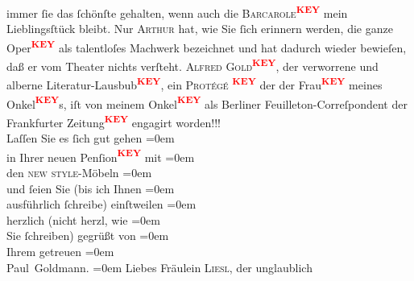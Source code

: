 \begin{ledgroupsized}[t]{13cm}
               immer ſie das ſchönſte gehalten, wenn auch die \textsc{Barcarole\textcolor{red}{\textsuperscript{\textbf{KEY}}}} mein Lieblingsſtück bleibt. Nur \textsc{Arthur} hat, wie Sie ſich erinnern werden, die ganze Oper\textcolor{red}{\textsuperscript{\textbf{KEY}}}
               als talentloſes Machwerk bezeichnet und hat dadurch wieder bewieſen, daß er vom
               Theater nichts verſteht.\pend
           \pstart
           \textsc{Alfred Gold\textcolor{red}{\textsuperscript{\textbf{KEY}}}}, der verworrene {\pb} und
               alberne Literatur-Lausbub\textcolor{red}{\textsuperscript{\textbf{KEY}}}, ein \textsc{Protégé \textcolor{red}{\textsuperscript{\textbf{KEY}}}} der der Frau\textcolor{red}{\textsuperscript{\textbf{KEY}}} meines Onkel\textcolor{red}{\textsuperscript{\textbf{KEY}}}s, iſt von meinem Onkel\textcolor{red}{\textsuperscript{\textbf{KEY}}} als Berliner
               Feuilleton-Correſpondent der Frankfurter Zeitung\textcolor{red}{\textsuperscript{\textbf{KEY}}} engagirt
               worden!!! {\\[\baselineskip]}Laſſen Sie es ſich gut gehen\pend
           \leftskip=0em{}\pstart
           {\\[\baselineskip]}in Ihrer neuen Penſion\textcolor{red}{\textsuperscript{\textbf{KEY}}} mit\pend
           \leftskip=0em{}\pstart
           {\\[\baselineskip]}den \textsc{new style}-Möbeln\pend
           \leftskip=0em{}\pstart
           {\\[\baselineskip]}und ſeien Sie (bis ich Ihnen\pend
           \leftskip=0em{}\pstart
           {\\[\baselineskip]}ausführlich ſchreibe) einſtweilen\pend
           \leftskip=0em{}\pstart
           {\\[\baselineskip]}herzlich (nicht herzl, wie\pend
           \leftskip=0em{}\pstart
           {\\[\baselineskip]}Sie ſchreiben) gegrüßt von\pend
           \leftskip=0em{}\pstart
           {\\[\baselineskip]}Ihrem getreuen\pend
           \leftskip=0em{}\pstart
           {\\[\baselineskip]}\spacefill\mbox{Paul Goldmann.}\pend
           \leftskip=0em{}\pstart
           {\pb}\pend
           \pstart
           Liebes Fräulein \textsc{Liesl}, der unglaublich

\end{ledgroupsized}
